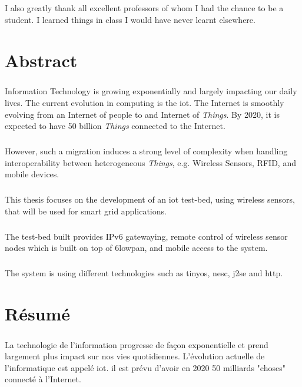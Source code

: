 \documentclass[oneside,12pt,a4paper,final]{book}
\begin{document}
\paragraph{}
I also greatly thank all excellent professors of whom I had the chance to be a student. I learned things in class  I would have never learnt elsewhere.


\chapter{Abstract}
\paragraph{}
Information Technology is growing exponentially and largely impacting our daily lives. The current evolution in computing is the \gls{iot}. The Internet is smoothly evolving from an Internet of people to and Internet of \textit{Things}. By 2020, it is expected to have 50 billion \textit{Things} connected to the Internet. 
\paragraph{}
However, such a migration induces a strong level of complexity when handling interoperability between heterogeneous \textit{Things}, e.g. Wireless Sensors, RFID, and mobile devices.
\paragraph{}
This thesis focuses on the development of an \gls{iot} test-bed, using wireless sensors, that will be used for smart grid applications.
\paragraph{}
The test-bed built provides IPv6 gatewaying, remote control of wireless sensor nodes which is built on top of \gls{6lowpan}, and mobile access to the system.
\paragraph{}
The system is using different technologies such as \gls{tinyos}, \gls{nesc}, \gls{j2se} and  \gls{http}.

\chapter{Résumé}
\paragraph{}
La technologie de l'information progresse de façon exponentielle et prend largement plus impact sur nos vies quotidiennes. L'évolution actuelle de l'informatique est appelé \gls{iot}. il est prévu d'avoir en 2020 50 milliards "choses" connecté à l'Internet.
\end{document}
